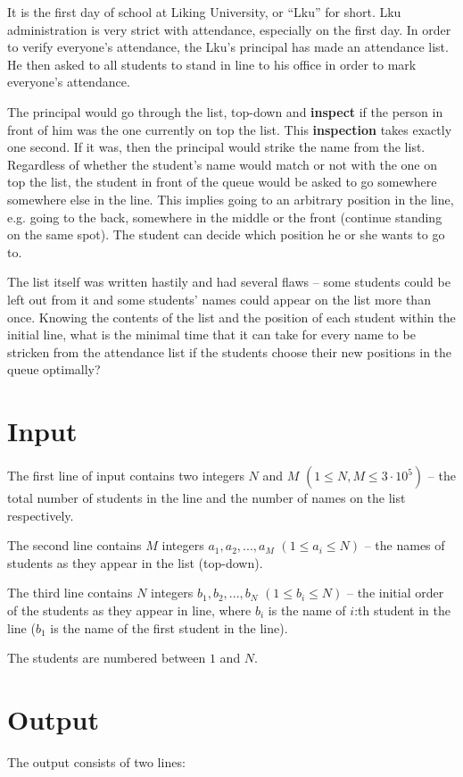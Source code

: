 It is the first day of school at Liking University, or ``Lku'' for short.
Lku administration is very strict with attendance, especially on the first day.
In order to verify everyone's attendance, the Lku's principal has made an attendance list.
He then asked to all students to stand in line to his office in order to mark everyone's attendance.

The principal would go through the list, top-down and \textbf{inspect} if the person in front of him was the one currently on top the list.
This \textbf{inspection} takes exactly one second.
If it was, then the principal would strike the name from the list.
Regardless of whether the student's name would match or not with the one on top the list, the student in front of the queue would be asked to go somewhere somewhere else in the line.
This implies going to an arbitrary position in the line, e.g. going to the back, somewhere in the middle or the front (continue standing on the same spot).
The student can decide which position he or she wants to go to.

The list itself was written hastily and had several flaws -- some students could be left out from it and some students' names could appear on the list more than once.
Knowing the contents of the list and the position of each student within the initial line, what is the minimal time that it can take for every name to be stricken from the attendance list if the students choose their new positions in the queue optimally?

\section*{Input}
The first line of input contains two integers $N$ and $M$ $(1 \leq N, M \leq 3 \cdot 10^5)$ -- the total number of students in the line and the number of names on the list respectively.

The second line contains $M$ integers $a_1, a_2, ... , a_M$ $(1 \leq a_i \leq N)$ -- the names of students as they appear in the list (top-down).

The third line contains $N$ integers $b_1, b_2, ... , b_N$ $(1 \leq b_i \leq N)$ -- the initial order of the students as they appear in line, where $b_i$ is the name of $i$:th student in the line ($b_1$ is the name of the first student in the line).

The students are numbered between $1$ and $N$.

\section*{Output}
The output consists of two lines:

